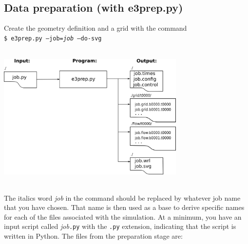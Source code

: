 \documentclass[12pt,a4paper,twoside]{article}
\begin{document}
\subsection{Data preparation (with e3prep.py)}
Create the geometry definition and a grid with the command\\
         \texttt{\$ e3prep.py --job=\textit{job} --do-svg }\\ 
         \vspace{0.25cm} \\
         \centerline{\includegraphics[width=0.7\textwidth]{figs/preparation.png}}\\
         The italics word \textit{job} in the command should be replaced 
         by whatever job name that you have chosen.
         That name is then used as a base to derive specific names for each of
         the files associated with the simulation.
         At a minimum, you have an input script called \textit{job}\texttt{.py} 
         with the \texttt{.py} extension, indicating that the script is written in Python.
         The files from the preparation stage are:
\end{document}
